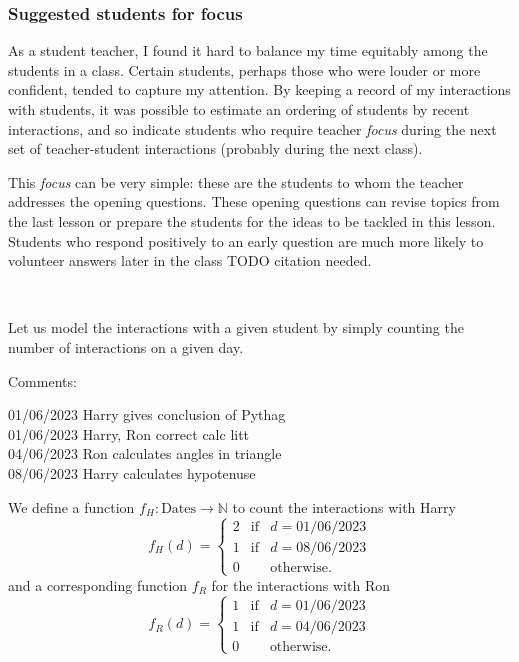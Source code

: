 \documentclass[10pt]{article}
\begin{document}
\subsubsection{Suggested students for focus} \label{output_focus}

As a student teacher, I found it hard to balance my time equitably among the students in a class. Certain students, perhaps those who were louder or more confident, tended to capture my attention. By keeping a record of my interactions with students, it was possible to estimate an ordering of students by recent interactions, and so indicate students who require teacher \emph{focus} during the next set of teacher-student interactions (probably during the next class).

This \emph{focus} can be very simple: these are the students to whom the teacher addresses the opening questions. These opening questions can revise topics from the last lesson or prepare the students for the ideas to be tackled in this lesson. Students who respond positively to an early question are much more likely to volunteer answers later in the class TODO citation needed.

\

Let us model the interactions with a given student by simply counting the number of interactions on a given day.

\begin{tcolorbox}
Comments:

01/06/2023 Harry gives conclusion of Pythag \\
01/06/2023 Harry, Ron correct calc litt \\
04/06/2023 Ron calculates angles in triangle \\
08/06/2023 Harry calculates hypotenuse
\end{tcolorbox}
We define a function $f_H : \mbox{Dates} \to \mathbb{N}$ to count the interactions with Harry
$$ f_{H}(d) = \left\{ \begin{matrix} 2 &  \mbox{if} & d=\mbox{01/06/2023} \\ 1 & \mbox{if} & d=\mbox{08/06/2023}  \\ 0 && \mbox{otherwise.} \end{matrix} \right. $$
and a corresponding function $f_R$ for the interactions with Ron
$$ f_{R}(d) = \left\{ \begin{matrix} 1 &  \mbox{if} & d=\mbox{01/06/2023}  \\ 1 &  \mbox{if} & d=\mbox{04/06/2023}  \\  0 && \mbox{otherwise.} \end{matrix} \right. $$
\end{document}
